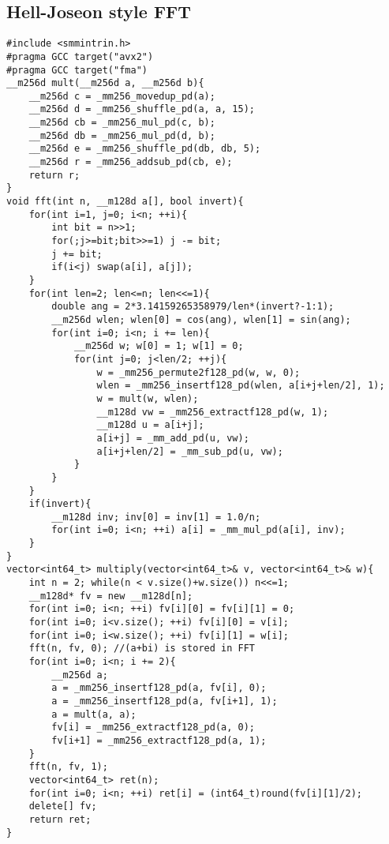\documentclass[landscape, 10pt, a4paper, oneside,  twocolumn]{article}
\begin{document}
\subsection{Hell-Joseon style FFT}
\begin{verbatim}
#include <smmintrin.h>
#pragma GCC target("avx2")
#pragma GCC target("fma")
__m256d mult(__m256d a, __m256d b){
    __m256d c = _mm256_movedup_pd(a);
    __m256d d = _mm256_shuffle_pd(a, a, 15);
    __m256d cb = _mm256_mul_pd(c, b);
    __m256d db = _mm256_mul_pd(d, b);
    __m256d e = _mm256_shuffle_pd(db, db, 5);
    __m256d r = _mm256_addsub_pd(cb, e);
    return r;    
}
void fft(int n, __m128d a[], bool invert){
    for(int i=1, j=0; i<n; ++i){
        int bit = n>>1;
        for(;j>=bit;bit>>=1) j -= bit;
        j += bit;
        if(i<j) swap(a[i], a[j]);
    }
    for(int len=2; len<=n; len<<=1){
        double ang = 2*3.14159265358979/len*(invert?-1:1);
        __m256d wlen; wlen[0] = cos(ang), wlen[1] = sin(ang);
        for(int i=0; i<n; i += len){
            __m256d w; w[0] = 1; w[1] = 0;
            for(int j=0; j<len/2; ++j){
                w = _mm256_permute2f128_pd(w, w, 0);
                wlen = _mm256_insertf128_pd(wlen, a[i+j+len/2], 1);
                w = mult(w, wlen);
                __m128d vw = _mm256_extractf128_pd(w, 1);
                __m128d u = a[i+j];
                a[i+j] = _mm_add_pd(u, vw);
                a[i+j+len/2] = _mm_sub_pd(u, vw);
            }
        }
    }
    if(invert){
        __m128d inv; inv[0] = inv[1] = 1.0/n;
        for(int i=0; i<n; ++i) a[i] = _mm_mul_pd(a[i], inv);
    }
}
vector<int64_t> multiply(vector<int64_t>& v, vector<int64_t>& w){
    int n = 2; while(n < v.size()+w.size()) n<<=1; 
    __m128d* fv = new __m128d[n];
    for(int i=0; i<n; ++i) fv[i][0] = fv[i][1] = 0;
    for(int i=0; i<v.size(); ++i) fv[i][0] = v[i];
    for(int i=0; i<w.size(); ++i) fv[i][1] = w[i];
    fft(n, fv, 0); //(a+bi) is stored in FFT
    for(int i=0; i<n; i += 2){
        __m256d a;
        a = _mm256_insertf128_pd(a, fv[i], 0);
        a = _mm256_insertf128_pd(a, fv[i+1], 1);
        a = mult(a, a);
        fv[i] = _mm256_extractf128_pd(a, 0);
        fv[i+1] = _mm256_extractf128_pd(a, 1);
    }
    fft(n, fv, 1); 
    vector<int64_t> ret(n);
    for(int i=0; i<n; ++i) ret[i] = (int64_t)round(fv[i][1]/2);
    delete[] fv;
    return ret;
}

\end{verbatim}
\end{document}
